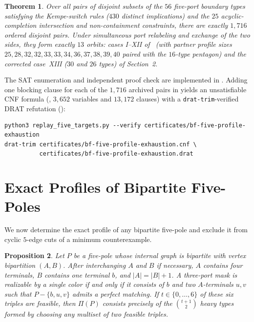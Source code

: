 \documentclass[11pt]{article}
\newtheorem{theorem}{Theorem}
\newtheorem{proposition}[theorem]{Proposition}
\theoremstyle{remark}
\begin{document}
\begin{theorem}\label{thm:replay}
Over all pairs of disjoint subsets of the $56$ five-port boundary types satisfying the
Kempe-switch rules ($430$ distinct implications) and the $25$ acyclic-completion
intersection and non-containment constraints, there are exactly $1{,}716$ ordered
disjoint pairs. Under simultaneous port relabeling and exchange of the two sides, they
form exactly $13$ orbits: cases I--XII of~\cite{MMT} (with partner profile sizes
$25, 28, 32, 32, 33, 33, 34, 36, 37, 38, 39, 40$ paired with the $16$-type pentagon) and
the corrected case~XIII ($30$ and $26$ types) of Section~2.
\end{theorem}

The SAT enumeration and independent proof check are implemented in
. Adding one blocking clause for each of the $1{,}716$
archived pairs in  yields an
unsatisfiable CNF formula (, $3{,}652$ variables
and $13{,}172$ clauses) with a \texttt{drat-trim}-verified DRAT refutation
():
{\small\begin{verbatim}
python3 replay_five_targets.py --verify certificates/bf-five-profile-exhaustion
drat-trim certificates/bf-five-profile-exhaustion.cnf \
          certificates/bf-five-profile-exhaustion.drat
\end{verbatim}}

\section{Exact Profiles of Bipartite Five-Poles}

We now determine the exact profile of any bipartite five-pole and exclude it from cyclic
$5$-edge cuts of a minimum counterexample.

\begin{proposition}\label{prop:bipartite-six}
Let $P$ be a five-pole whose internal graph is bipartite with vertex bipartition $(A,B)$.
After interchanging $A$ and $B$ if necessary, $A$ contains four terminals, $B$ contains
one terminal $b$, and $|A| = |B| + 1$. A three-port mask is realizable by a single color
if and only if it consists of $b$ and two $A$-terminals $u, v$ such that $P - \{b,u,v\}$
admits a perfect matching. If $t \in \{0,\dots,6\}$ of these six triples are feasible,
then $\Pi(P)$ consists precisely of the $\binom{t+1}{2}$ heavy types formed by choosing
any multiset of two feasible triples.
\end{proposition}
\end{document}
